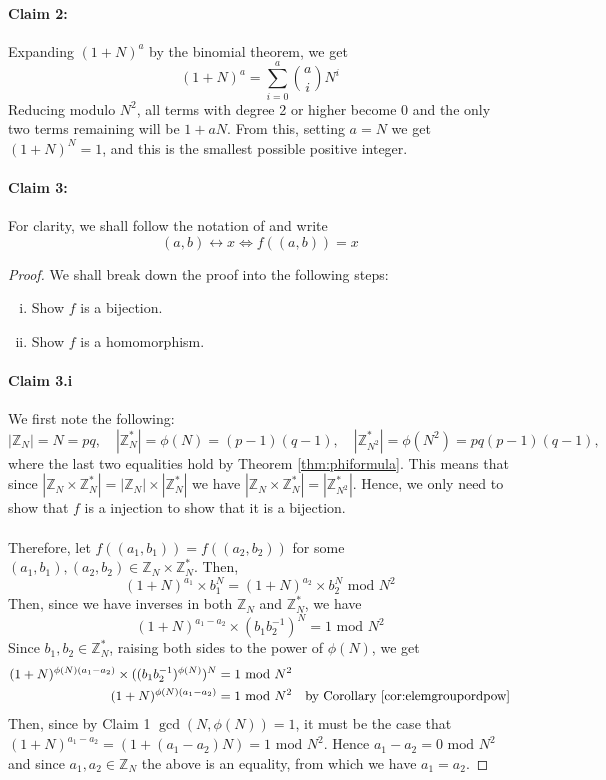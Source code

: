 \documentclass{article}
\theoremstyle{definition}
\newcommand{\Int}{\mathbb{Z}}
\renewcommand{\mod}{\,\,\text{mod}\,\,}
\begin{document}
\paragraph{Claim 2:} Expanding $(1 + N)^a$ by the binomial theorem, we get
\[
  (1 + N)^a = \sum_{i =0}^a \binom{a}{i} N^i
\]
Reducing modulo $N^2$, all terms with degree 2 or higher become 0 and the only
two terms remaining will be $1 + aN$. From this, setting $a = N$ we get $(1 +
N)^N = 1$, and this is the smallest possible positive integer.
\paragraph{Claim 3:}
For clarity, we shall follow the notation of \cite{katz2014introduction} and
write
\[
  (a, b) \leftrightarrow x \Leftrightarrow f((a,b)) = x
\]
\begin{proof}
  We shall break down the proof into the following steps:
  \begin{enumerate}[i.]
  \item Show $f$ is a bijection.
  \item Show $f$ is a homomorphism.
  \end{enumerate}
  \paragraph{Claim 3.i} We first note the following:
  \[
    |\Int_{N}| = N = pq,\quad
    |\Int_{N}^*| = \phi(N) = (p - 1)(q - 1),\quad
    |\Int_{N^2}^*| = \phi(N^2) = pq(p - 1)(q - 1),
  \]
  where the last two equalities hold by Theorem \ref{thm:phiformula}.
  This means that since $|\Int_{N} \times \Int_{N}^*| = |\Int_{N}|
  \times |\Int_{N}^*|$ we have $|\Int_{N} \times \Int_{N}^*| = |\Int_{N^2}^*|$.
  Hence, we only need to show that $f$ is a injection to show that it is a bijection.
  \paragraph{}
  Therefore, let $f((a_1, b_1)) = f((a_2, b_2))$ for some $(a_1, b_1), (a_2,
  b_2) \in \Int_{N} \times \Int_{N}^*$. Then,
  \[
    (1 + N)^{a_1}\times b_1^N = (1 + N)^{a_2}\times b_2^N\mod N^2
  \]
  Then, since we have inverses in both $\Int_N$ and $\Int_N^*$, we have
  \[
    (1 + N)^{a_1 - a_2}\times (b_1b_2^{-1})^N = 1 \mod N^2
  \]
  Since $b_1, b_2 \in \Int_N^*$, raising both sides to the power of $\phi(N)$,
  we get
  \begin{align*}
    (1 + N)^{\phi(N)(a_1 - a_2)} \times ((b_1b_2^{-1})^{\phi(N)})^N &= 1 \mod N^2 \\
    (1 + N)^{\phi(N)(a_1 - a_2)}  &= 1 \mod N^2\quad\text{by Corollary \ref{cor:elemgroupordpow}}
  \end{align*}
  Then, since by Claim 1 $\gcd(N, \phi(N)) = 1$, it must be the case that $(1 +
  N)^{a_1 - a_2} = (1 + (a_1 - a_2)N) = 1 \mod N^2$. Hence $a_1 - a_2 = 0 \mod N^2$
  and since $a_1, a_2 \in \Int_N$ the above is an equality, from which we have
  $a_1 = a_2$.

\end{proof}
\end{document}
